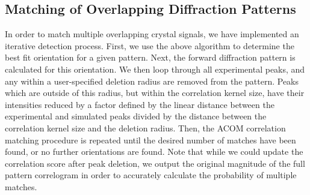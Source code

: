 \documentclass[%
 superscriptaddress,
 aip,
 amsmath,amssymb,
reprint,%
 author-year,%
longbibliography
]{revtex4-2}
\newcommand{\ft}{\mathcal{F}}
\newcommand{\ift}{\mathcal{F}^{-1}}
\begin{document}
\subsection*{Matching of Overlapping Diffraction Patterns}

In order to match multiple overlapping crystal signals, we have implemented an iterative detection process.  First, we use the above algorithm to determine the best fit orientation for a given pattern. Next, the forward diffraction pattern is calculated for this orientation. We then loop through all experimental peaks, and any within a user-specified deletion radius are removed from the pattern. Peaks which are outside of this radius, but within the correlation kernel size, have their intensities reduced by a factor defined by the linear distance between the experimental and simulated peaks divided by the distance between the correlation kernel size and the deletion radius. Then, the ACOM correlation matching procedure is repeated until the desired number of matches have been found, or no further orientations are found. Note that while we could update the correlation score after peak deletion, we output the original magnitude of the full pattern correlogram in order to accurately calculate the probability of multiple matches.








\end{document}
